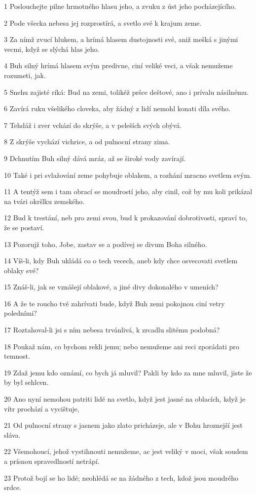 \par 1 Poslouchejte pilne hrmotného hlasu jeho, a zvuku z úst jeho pocházejícího.
\par 2 Pode všecka nebesa jej rozprostírá, a svetlo své k krajum zeme.
\par 3 Za nímž zvucí hlukem, a hrímá hlasem dustojnosti své, aniž mešká s jinými vecmi, když se slýchá hlas jeho.
\par 4 Buh silný hrímá hlasem svým predivne, ciní veliké veci, a však nemužeme rozumeti, jak.
\par 5 Snehu zajisté ríká: Bud na zemi, tolikéž pršce deštové, ano i prívalu násilnému.
\par 6 Zavírá ruku všelikého cloveka, aby žádný z lidí nemohl konati díla svého.
\par 7 Tehdáž i zver vchází do skrýše, a v peleších svých obývá.
\par 8 Z skrýše vychází vichrice, a od pulnocní strany zima.
\par 9 Dchnutím Buh silný dává mráz, až se široké vody zavírají.
\par 10 Také i pri svlažování zeme pohybuje oblakem, a rozhání mracno svetlem svým.
\par 11 A tentýž sem i tam obrací se moudrostí jeho, aby cinil, což by mu koli prikázal na tvári okršlku zemského.
\par 12 Bud k trestání, neb pro zemi svou, bud k prokazování dobrotivosti, spraví to, že se postaví.
\par 13 Pozorujž toho, Jobe, zastav se a podívej se divum Boha silného.
\par 14 Víš-li, kdy Buh ukládá co o tech vecech, aneb kdy chce osvecovati svetlem oblaky své?
\par 15 Znáš-li, jak se vznášejí oblakové, a jiné divy dokonalého v umeních?
\par 16 A že te roucho tvé zahrívati bude, když Buh zemi pokojnou ciní vetry poledními?
\par 17 Roztahoval-li jsi s ním nebesa trvánlivá, k zrcadlu slitému podobná?
\par 18 Poukaž nám, co bychom rekli jemu; nebo nemužeme ani reci zporádati pro temnost.
\par 19 Zdaž jemu kdo oznámí, co bych já mluvil? Pakli by kdo za mne mluvil, jiste že by byl sehlcen.
\par 20 Ano nyní nemohou patriti lidé na svetlo, když jest jasné na oblacích, když je vítr prochází a vycištuje,
\par 21 Od pulnocní strany s jasnem jako zlato pricházeje, ale v Bohu hroznejší jest sláva.
\par 22 Všemohoucí, jehož vystihnouti nemužeme, ac jest veliký v moci, však soudem a prísnou spravedlností netrápí.
\par 23 Protož bojí se ho lidé; neohlédá se na žádného z tech, kdož jsou moudrého srdce.

